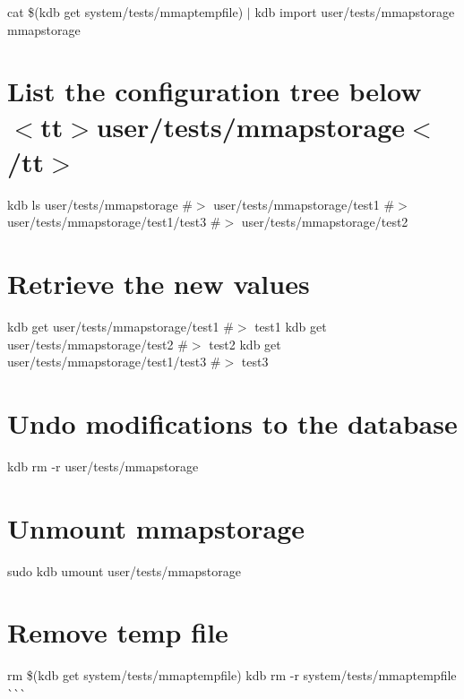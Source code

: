 cat \$(kdb get system/tests/mmaptempfile) $\vert$ kdb import user/tests/mmapstorage mmapstorage\hypertarget{autotoc_md442_autotoc_md459}{}\section{List the configuration tree below $<$tt$>$user/tests/mmapstorage$<$/tt$>$}\label{autotoc_md442_autotoc_md459}
kdb ls user/tests/mmapstorage \#$>$ user/tests/mmapstorage/test1 \#$>$ user/tests/mmapstorage/test1/test3 \#$>$ user/tests/mmapstorage/test2\hypertarget{autotoc_md442_autotoc_md460}{}\section{Retrieve the new values}\label{autotoc_md442_autotoc_md460}
kdb get user/tests/mmapstorage/test1 \#$>$ test1 kdb get user/tests/mmapstorage/test2 \#$>$ test2 kdb get user/tests/mmapstorage/test1/test3 \#$>$ test3\hypertarget{autotoc_md442_autotoc_md461}{}\section{Undo modifications to the database}\label{autotoc_md442_autotoc_md461}
kdb rm -\/r user/tests/mmapstorage\hypertarget{autotoc_md442_autotoc_md462}{}\section{Unmount mmapstorage}\label{autotoc_md442_autotoc_md462}
sudo kdb umount user/tests/mmapstorage\hypertarget{autotoc_md442_autotoc_md463}{}\section{Remove temp file}\label{autotoc_md442_autotoc_md463}
rm \$(kdb get system/tests/mmaptempfile) kdb rm -\/r system/tests/mmaptempfile \`{}\`{}\`{} 